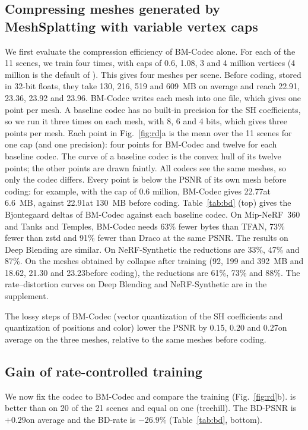\subsection{Compressing meshes generated by MeshSplatting with variable vertex caps}
\label{sec:codec}
We first evaluate the compression efficiency of BM-Codec alone. For each of the 11 scenes, we train \MSc four times, with caps of 0.6, 1.08, 3 and 4 million vertices (4 million is the default of \MS). This gives four meshes per scene. Before coding, stored in 32-bit floats, they take 130, 216, 519 and 609~MB on average and reach 22.91, 23.36, 23.92 and 23.96\dB. BM-Codec writes each mesh into one file, which gives one point per mesh. A baseline codec has no built-in precision for the SH coefficients, so we run it three times on each mesh, with 8, 6 and 4 bits, which gives three points per mesh. Each point in Fig.~\ref{fig:rd}a is the mean over the 11 scenes for one cap (and one precision): four points for BM-Codec and twelve for each baseline codec. The curve of a baseline codec is the convex hull of its twelve points; the other points are drawn faintly. All codecs see the same meshes, so only the codec differs. Every point is below the PSNR of its own mesh before coding: for example, with the cap of 0.6 million, BM-Codec gives 22.77\dB at 6.6~MB, against 22.91\dB at 130~MB before coding. Table~\ref{tab:bd} (top) gives the Bjontegaard deltas of BM-Codec against each baseline codec. On Mip-NeRF~360 and Tanks and Temples, BM-Codec needs 63\% fewer bytes than TFAN, 73\% fewer than zstd and 91\% fewer than Draco at the same PSNR. The results on Deep Blending are similar. On NeRF-Synthetic the reductions are 33\%, 47\% and 87\%. On the meshes obtained by collapse after training (92, 199 and 392~MB and 18.62, 21.30 and 23.23\dB before coding), the reductions are 61\%, 73\% and 88\%. The rate--distortion curves on Deep Blending and NeRF-Synthetic are in the supplement.

The lossy steps of BM-Codec (vector quantization of the SH coefficients and quantization of positions and color) lower the PSNR by 0.15, 0.20 and 0.27\dB on average on the three \MSc meshes, relative to the same meshes before coding.

\subsection{Gain of rate-controlled training}
\label{sec:rd}
We now fix the codec to BM-Codec and compare the training (Fig.~\ref{fig:rd}b). \BM is better than \MSc on 20 of the 21 scenes and equal on one (treehill). The BD-PSNR is $+0.29$\dB on average and the BD-rate is $-26.9\%$ (Table~\ref{tab:bd}, bottom).

